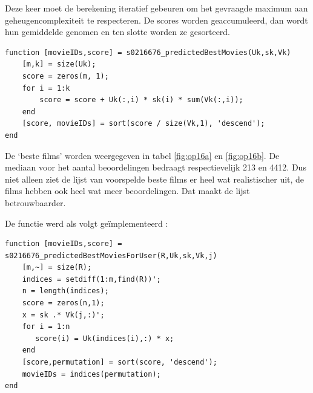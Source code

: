 
Deze keer moet de berekening iteratief gebeuren om het gevraagde maximum aan geheugencomplexiteit te respecteren. De scores worden geaccumuleerd, dan wordt hun gemiddelde genomen en ten slotte worden ze gesorteerd.

\begin{lstlisting}
function [movieIDs,score] = s0216676_predictedBestMovies(Uk,sk,Vk)
    [m,k] = size(Uk);
    score = zeros(m, 1);
    for i = 1:k
        score = score + Uk(:,i) * sk(i) * sum(Vk(:,i));
    end
    [score, movieIDs] = sort(score / size(Vk,1), 'descend');
end
\end{lstlisting}



De `beste films' worden weergegeven in tabel \ref{fig:op16a} en \ref{fig:op16b}. De mediaan voor het aantal beoordelingen bedraagt respectievelijk 213 en 4412. Dus niet alleen ziet de lijst van voorspelde beste films er heel wat realistischer uit, de films hebben ook heel wat meer beoordelingen. Dat maakt de lijst betrouwbaarder.



De functie werd als volgt ge\"implementeerd :

\begin{lstlisting}
function [movieIDs,score] = s0216676_predictedBestMoviesForUser(R,Uk,sk,Vk,j)
    [m,~] = size(R);
    indices = setdiff(1:m,find(R))';
    n = length(indices);
    score = zeros(n,1);
    x = sk .* Vk(j,:)';
    for i = 1:n
       score(i) = Uk(indices(i),:) * x;
    end
    [score,permutation] = sort(score, 'descend');
    movieIDs = indices(permutation);
end
\end{lstlisting}

\thispagestyle{empty}

